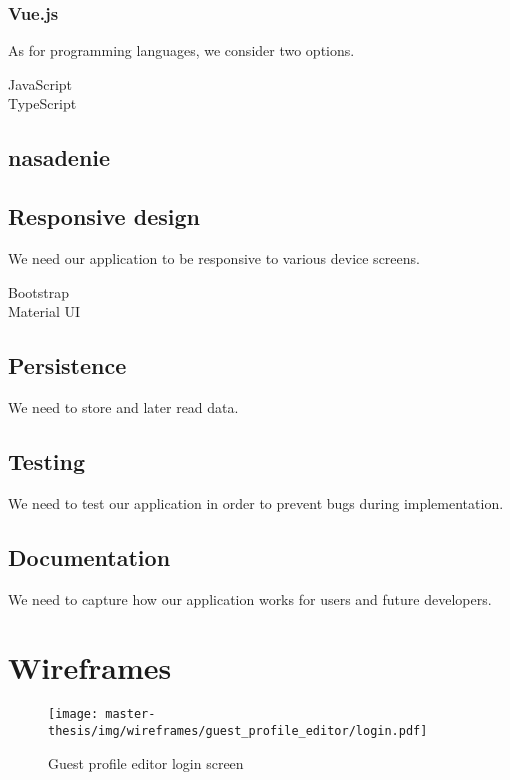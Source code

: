 \subsubsection*{Vue.js}

As for programming languages, we consider two options. 

\begin{description}
  \item[JavaScript] 
  \item[TypeScript] 
\end{description}


\subsection{nasadenie}

\subsection{Responsive design}
We need our application to be responsive to various device screens.
\begin{description}
  \item[Bootstrap] 
  \item[Material UI] 
\end{description}

\subsection{Persistence}
We need to store and later read data.

\subsection{Testing}
We need to test our application in order to prevent bugs during implementation.

\subsection{Documentation}
We need to capture how our application works for users and future developers.

\section{Wireframes}
\begin{figure}[h]
  \centering
  \texttt{[image: master-thesis/img/wireframes/guest\_profile\_editor/login.pdf]}
  \caption{Guest profile editor login screen}
\end{figure}

